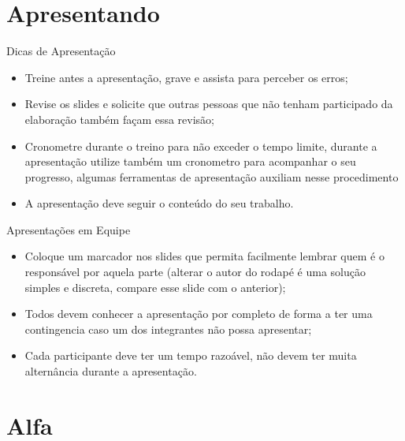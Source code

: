 \documentclass[%
    english,
    brazil]{ifsp-spo-beamer}
\begin{document}
\section{Apresentando}
\begin{frame}{Dicas de Apresentação}
    \begin{itemize}
        
        \item Treine antes a apresentação, grave e assista para perceber os erros;
        
        \item Revise os slides e solicite que outras pessoas que não tenham participado da elaboração também façam essa revisão;
        
        \item Cronometre durante o treino para não exceder o tempo limite, durante a apresentação utilize também um cronometro para acompanhar o seu progresso, algumas ferramentas de apresentação auxiliam nesse procedimento
        
        \item A apresentação deve seguir o conteúdo do seu trabalho.
        
    \end{itemize}    
\end{frame}

\begin{frame}{Apresentações em Equipe}
    \begin{itemize}
        \item Coloque um marcador nos slides que permita facilmente lembrar quem é o responsável por aquela parte (alterar o autor do rodapé é uma solução simples e discreta, compare esse slide com o anterior);
        
        \item Todos devem conhecer a apresentação por completo de forma a ter uma contingencia caso um dos integrantes não possa apresentar;
        
        \item Cada participante deve ter um tempo razoável, não devem ter muita alternância durante a apresentação.
    \end{itemize}    
\end{frame}



\section{Alfa}
\end{document}
